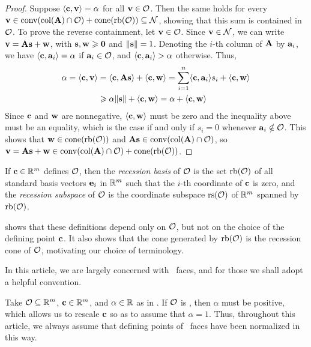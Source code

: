 \documentclass{article}
\begin{document}
\begin{proof}
   Suppose $\langle \mathbf{c}, \mathbf{v} \rangle = \alpha$ for all $\mathbf{v} \in \mathcal{O}$.
   Then the same holds for every $\mathbf{v} \in\operatorname{conv}( \operatorname{col}(\mathbf{A}) \cap \mathcal{O} ) + \operatorname{cone}(\operatorname{rb}(\mathcal{O})) \subseteq \mathcal{N}$, showing that this sum is contained in  $\mathcal{O}$.
   To prove the reverse containment, let $\mathbf{v} \in \mathcal{O}$.
   Since $\mathbf{v} \in \mathcal{N}$, we can write $\mathbf{v} = \mathbf{A} \mathbf{s} + \mathbf{w}$, with $\mathbf{s}, \mathbf{w}\geqslant \mathbf{0}$ and $\| \mathbf{s} \| = 1$.
   Denoting the $i$-th column of $\mathbf{A}$ by $\mathbf{a}_i$, we have $\langle \mathbf{c}, \mathbf{a}_i \rangle = \alpha$ if $\mathbf{a}_i \in \mathcal{O}$, and $\langle \mathbf{c}, \mathbf{a}_i \rangle > \alpha$ otherwise.
   Thus, 
   \begin{align*}
     \alpha = \langle \mathbf{c}, \mathbf{v} \rangle &= \langle \mathbf{c}, \mathbf{A}\mathbf{s} \rangle + \langle \mathbf{c}, \mathbf{w} \rangle
     = \sum_{i=1}^n \langle \mathbf{c}, \mathbf{a}_i \rangle s_i + \langle \mathbf{c}, \mathbf{w} \rangle\\
     &\geqslant \alpha \| \mathbf{s} \| + \langle \mathbf{c}, \mathbf{w} \rangle = \alpha + \langle \mathbf{c}, \mathbf{w} \rangle
   \end{align*}
   Since $\mathbf{c}$ and $\mathbf{w}$ are nonnegative, $\langle \mathbf{c}, \mathbf{w} \rangle$ must be zero and the inequality above must be an equality, which is the case if and only if $s_i = 0$ whenever $\mathbf{a}_i \notin \mathcal{O}$.
   This shows that $\mathbf{w} \in \operatorname{cone}(\operatorname{rb}(\mathcal{O}))$ and $\mathbf{A}\mathbf{s} \in \operatorname{conv}(\operatorname{col}(\mathbf{A}) \cap \mathcal{O})$, so $\mathbf{v} = \mathbf{A}\mathbf{s} + \mathbf{w} \in \operatorname{conv}( \operatorname{col}(\mathbf{A}) \cap \mathcal{O} ) + \operatorname{cone}(\operatorname{rb}(\mathcal{O}))$.
\end{proof}

\begin{definition}
   If $\mathbf{c} \in \mathbb{R}^m$ defines $\mathcal{O}$, then the \emph{recession basis} of $\mathcal{O}$ is the set $\operatorname{rb}(\mathcal{O})$ of all standard basis vectors $\mathbf{e}_i$ in $\mathbb{R}^m$ such that the $i$-th coordinate of $\mathbf{c}$ is zero, and the \emph{recession subspace} of $\mathcal{O}$ is the coordinate subspace $\operatorname{rs}(\mathcal{O})$ of $\mathbb{R}^m$ spanned by $\operatorname{rb}(\mathcal{O})$.
\end{definition}

 shows that these definitions depend only on $\mathcal{O}$, but not on the choice of the defining point $\mathbf{c}$.
It also shows that the cone generated by $\operatorname{rb}(\mathcal{O})$ is the recession cone of $\mathcal{O}$, motivating our choice of terminology.

In this article, we are largely concerned with \positive\ faces, and for those we shall adopt a helpful convention.

\begin{convention}
\label{alpha=1: convention}
Take $\mathcal{O} \subseteq \mathbb{R}^m$, $\mathbf{c} \in \mathbb{R}^m$, and $\alpha \in \mathbb{R}$ as in .
If $\mathcal{O}$ is \positive, then $\alpha$ must be positive, which allows us to rescale $\mathbf{c}$ so as to assume that $\alpha = 1$.
Thus, throughout this article, we always assume that defining points of \positive\ faces have been normalized in this way.
\end{convention}
\end{document}

